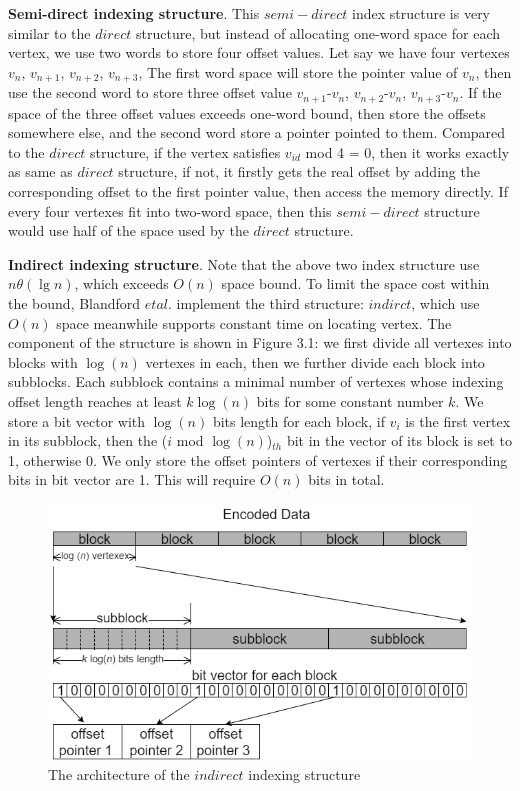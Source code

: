 \documentclass[12pt,glossary]{dalthesis}
\begin{document}
\bigskip
\bigskip

\textbf{Semi-direct indexing structure}. This $semi-direct$ index structure is very similar to the $direct$ structure, but instead of allocating one-word space for each vertex, we use two words to store four offset values. Let say we have four vertexes $v_{n}$, $v_{n+1}$, $v_{n+2}$, $v_{n+3}$, The first word space will store the pointer value of $v_{n}$, then use the second word to store three offset value $v_{n+1}$-$v_{n}$, $v_{n+2}$-$v_{n}$, $v_{n+3}$-$v_{n}$. If the space of the three offset values exceeds one-word bound, then store the offsets somewhere else, and the second word store a pointer pointed to them. Compared to the $direct$ structure, if the vertex satisfies $v_{id}$ mod 4 = 0, then it works exactly as same as $direct$ structure, if not, it firstly gets the real offset by adding the corresponding offset to the first pointer value, then access the memory directly. If every four vertexes fit into two-word space, then this $semi-direct$ structure would use half of the space used by the $direct$ structure.     

\bigskip
\bigskip

\textbf{Indirect indexing structure}. Note that the above two index structure use $n \theta (\lg n)$, which exceeds $O(n)$ space bound. To limit the space cost within the bound, Blandford $et al.$ implement the third structure: $indirct$, which use $O(n)$ space meanwhile supports constant time on locating vertex. The component of the structure is shown in  Figure 3.1: we first divide all vertexes into blocks with $\log(n)$ vertexes in each, then we further divide each block into subblocks. Each subblock contains a minimal number of vertexes whose indexing offset length reaches at least $k\log(n)$ bits for some constant number $k$. We store a bit vector with $\log(n)$ bits length for each block, if $v_{i}$ is the first vertex in its subblock, then the ($i$ mod $\log (n)$)$_{th}$ bit in the vector of its block is set to 1, otherwise 0. We only store the offset pointers of vertexes if their corresponding bits in bit vector are 1. This will require $O(n)$ bits in total. 

\bigskip

\begin{figure}[ht]
\centering
\includegraphics[width=1.0\textwidth]{indirect}
\caption{The architecture of the $indirect$ indexing structure}
\end{figure}
\end{document}
